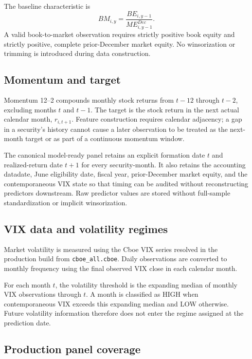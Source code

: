 The baseline characteristic is
\begin{equation}
BM_{i,y} = \frac{BE_{i,y-1}}{ME^{Dec}_{i,y-1}}.
\end{equation}
A valid book-to-market observation requires strictly positive book equity and strictly positive, complete prior-December market equity. No winsorization or trimming is introduced during data construction.

\subsection{Momentum and target}

Momentum 12--2 compounds monthly stock returns from $t-12$ through $t-2$, excluding months $t$ and $t-1$. The target is the stock return in the next actual calendar month, $r_{i,t+1}$. Feature construction requires calendar adjacency; a gap in a security's history cannot cause a later observation to be treated as the next-month target or as part of a continuous momentum window.

The canonical model-ready panel retains an explicit formation date $t$ and realized-return date $t+1$ for every security-month. It also retains the accounting datadate, June eligibility date, fiscal year, prior-December market equity, and the contemporaneous VIX state so that timing can be audited without reconstructing predictors downstream. Raw predictor values are stored without full-sample standardization or implicit winsorization.

\subsection{VIX data and volatility regimes}

Market volatility is measured using the Cboe VIX series resolved in the production build from \texttt{cboe\_all.cboe}. Daily observations are converted to monthly frequency using the final observed VIX close in each calendar month.

For each month $t$, the volatility threshold is the expanding median of monthly VIX observations through $t$. A month is classified as HIGH when contemporaneous VIX exceeds this expanding median and LOW otherwise. Future volatility information therefore does not enter the regime assigned at the prediction date.

\subsection{Production panel coverage}

